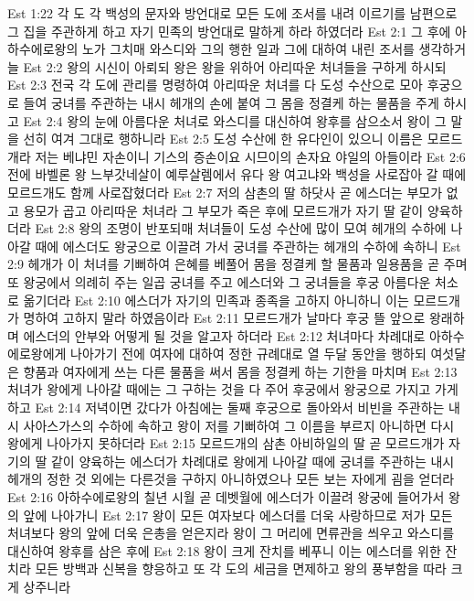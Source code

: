 Est 1:22  각 도 각 백성의 문자와 방언대로 모든 도에 조서를 내려 이르기를 남편으로 그 집을 주관하게 하고 자기 민족의 방언대로 말하게 하라 하였더라
Est 2:1  그 후에 아하수에로왕의 노가 그치매 와스디와 그의 행한 일과 그에 대하여 내린 조서를 생각하거늘
Est 2:2  왕의 시신이 아뢰되 왕은 왕을 위하어 아리따운 처녀들을 구하게 하시되
Est 2:3  전국 각 도에 관리를 명령하여 아리따운 처녀를 다 도성 수산으로 모아 후궁으로 들여 궁녀를 주관하는 내시 헤개의 손에 붙여 그 몸을 정결케 하는 물품을 주게 하시고
Est 2:4  왕의 눈에 아름다운 처녀로 와스디를 대신하여 왕후를 삼으소서 왕이 그 말을 선히 여겨 그대로 행하니라
Est 2:5  도성 수산에 한 유다인이 있으니 이름은 모르드개라 저는 베냐민 자손이니 기스의 증손이요 시므이의 손자요 야일의 아들이라
Est 2:6  전에 바벨론 왕 느부갓네살이 예루살렘에서 유다 왕 여고냐와 백성을 사로잡아 갈 때에 모르드개도 함께 사로잡혔더라
Est 2:7  저의 삼촌의 딸 하닷사 곧 에스더는 부모가 없고 용모가 곱고 아리따운 처녀라 그 부모가 죽은 후에 모르드개가 자기 딸 같이 양육하더라
Est 2:8  왕의 조명이 반포되매 처녀들이 도성 수산에 많이 모여 헤개의 수하에 나아갈 때에 에스더도 왕궁으로 이끌려 가서 궁녀를 주관하는 헤개의 수하에 속하니
Est 2:9  헤개가 이 처녀를 기뻐하여 은혜를 베풀어 몸을 정결케 할 물품과 일용품을 곧 주며 또 왕궁에서 의례히 주는 일곱 궁녀를 주고 에스더와 그 궁녀들을 후궁 아름다운 처소로 옮기더라
Est 2:10  에스더가 자기의 민족과 종족을 고하지 아니하니 이는 모르드개가 명하여 고하지 말라 하였음이라
Est 2:11  모르드개가 날마다 후궁 뜰 앞으로 왕래하며 에스더의 안부와 어떻게 될 것을 알고자 하더라
Est 2:12  처녀마다 차례대로 아하수에로왕에게 나아가기 전에 여자에 대하여 정한 규례대로 열 두달 동안을 행하되 여섯달은 향품과 여자에게 쓰는 다른 물품을 써서 몸을 정결케 하는 기한을 마치며
Est 2:13  처녀가 왕에게 나아갈 때에는 그 구하는 것을 다 주어 후궁에서 왕궁으로 가지고 가게 하고
Est 2:14  저녁이면 갔다가 아침에는 둘째 후궁으로 돌아와서 비빈을 주관하는 내시 사아스가스의 수하에 속하고 왕이 저를 기뻐하여 그 이름을 부르지 아니하면 다시 왕에게 나아가지 못하더라
Est 2:15  모르드개의 삼촌 아비하일의 딸 곧 모르드개가 자기의 딸 같이 양육하는 에스더가 차례대로 왕에게 나아갈 때에 궁녀를 주관하는 내시 헤개의 정한 것 외에는 다른것을 구하지 아니하였으나 모든 보는 자에게 굄을 얻더라
Est 2:16  아하수에로왕의 칠년 시월 곧 데벳월에 에스더가 이끌려 왕궁에 들어가서 왕의 앞에 나아가니
Est 2:17  왕이 모든 여자보다 에스더를 더욱 사랑하므로 저가 모든 처녀보다 왕의 앞에 더욱 은총을 얻은지라 왕이 그 머리에 면류관을 씌우고 와스디를 대신하여 왕후를 삼은 후에
Est 2:18  왕이 크게 잔치를 베푸니 이는 에스더를 위한 잔치라 모든 방백과 신복을 향응하고 또 각 도의 세금을 면제하고 왕의 풍부함을 따라 크게 상주니라

